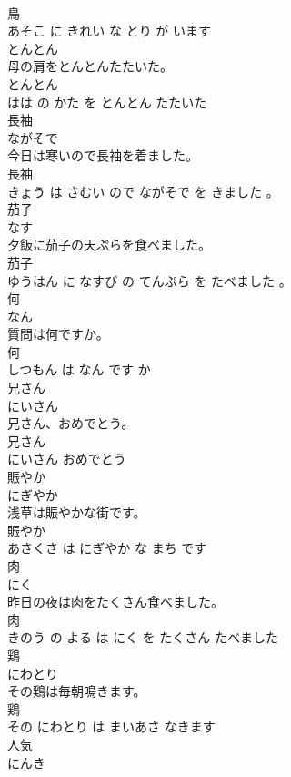 \documentclass[8pt]{extreport}
\begin{document}
\begin{CJK}{UTF8}{min}
\\	鳥 
\\	あそこ に きれい な とり が います			
\\	とんとん	
\\	母の肩をとんとんたたいた。	
\\	とんとん 
\\	はは の かた を とんとん たたいた			
\\	長袖	
\\	ながそで			
\\	今日は寒いので長袖を着ました。	
\\	長袖 
\\	きょう は さむい ので ながそで を きました 。			
\\	茄子	
\\	なす			
\\	夕飯に茄子の天ぷらを食べました。	
\\	茄子 
\\	ゆうはん に なすび の てんぷら を たべました 。			
\\	何	
\\	なん			
\\	質問は何ですか。	
\\	何 
\\	しつもん は なん です か			
\\	兄さん	
\\	にいさん			
\\	兄さん、おめでとう。	
\\	兄さん 
\\	にいさん おめでとう			
\\	賑やか	
\\	にぎやか			
\\	浅草は賑やかな街です。	
\\	賑やか 
\\	あさくさ は にぎやか な まち です			
\\	肉	
\\	にく			
\\	昨日の夜は肉をたくさん食べました。	
\\	肉 
\\	きのう の よる は にく を たくさん たべました			
\\	鶏	
\\	にわとり			
\\	その鶏は毎朝鳴きます。	
\\	鶏 
\\	その にわとり は まいあさ なきます			
\\	人気	
\\	にんき			

\end{CJK}
\end{document}
